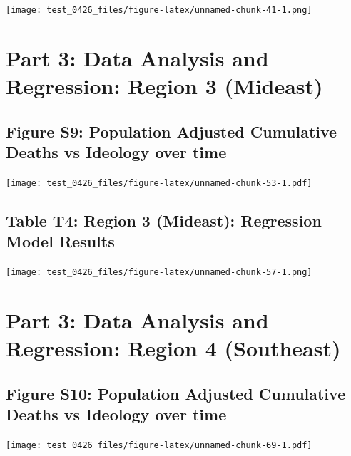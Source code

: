 \documentclass[
]{article}
\begin{document}
\texttt{[image: test\_0426\_files/figure-latex/unnamed-chunk-41-1.png]}

\newpage

\hypertarget{part-3-data-analysis-and-regression-region-3-mideast}{%
\section{Part 3: Data Analysis and Regression: Region 3
(Mideast)}\label{part-3-data-analysis-and-regression-region-3-mideast}}

\hypertarget{figure-s9-population-adjusted-cumulative-deaths-vs-ideology-over-time}{%
\subsection{Figure S9: Population Adjusted Cumulative Deaths vs Ideology
over
time}\label{figure-s9-population-adjusted-cumulative-deaths-vs-ideology-over-time}}

\texttt{[image: test\_0426\_files/figure-latex/unnamed-chunk-53-1.pdf]}

\hypertarget{table-t4-region-3-mideast-regression-model-results}{%
\subsection{Table T4: Region 3 (Mideast): Regression Model
Results}\label{table-t4-region-3-mideast-regression-model-results}}

\texttt{[image: test\_0426\_files/figure-latex/unnamed-chunk-57-1.png]}

\newpage

\hypertarget{part-3-data-analysis-and-regression-region-4-southeast}{%
\section{Part 3: Data Analysis and Regression: Region 4
(Southeast)}\label{part-3-data-analysis-and-regression-region-4-southeast}}

\hypertarget{figure-s10-population-adjusted-cumulative-deaths-vs-ideology-over-time}{%
\subsection{Figure S10: Population Adjusted Cumulative Deaths vs
Ideology over
time}\label{figure-s10-population-adjusted-cumulative-deaths-vs-ideology-over-time}}

\texttt{[image: test\_0426\_files/figure-latex/unnamed-chunk-69-1.pdf]}
\end{document}
